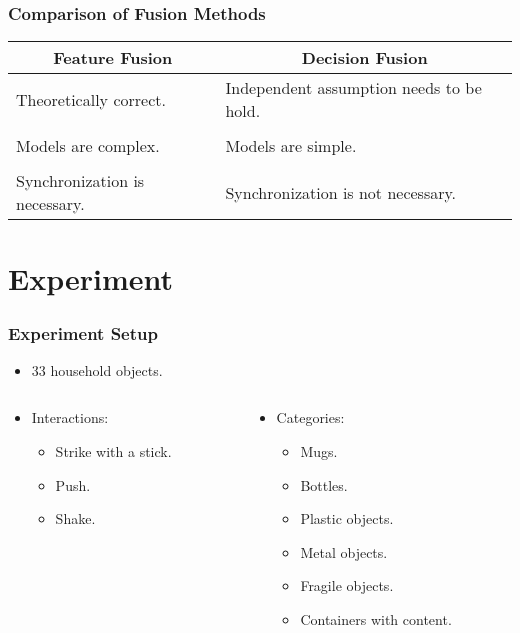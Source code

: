 \documentclass{beamer}
\begin{document}
  \begin{frame}
    \frametitle{Comparison of Fusion Methods}

    \centering
    \begin{tabular}{p{}|p{}}
      \hline
      \multicolumn{1}{c|}{\bfseries Feature Fusion} & \multicolumn{1}{c}{\bfseries Decision Fusion} \\ \hline
      Theoretically correct. & Independent assumption needs to be hold. \\
      \\
      Models are complex. & Models are simple. \\
      \\
      Synchronization is \mbox{necessary}. & Synchronization is not necessary. \\ \hline
    \end{tabular}

  \end{frame}

  \section{Experiment}
  \begin{frame}
    \frametitle{Experiment Setup}

    \begin{itemize}
      \item 33 household objects.
    \end{itemize}

    \begin{columns}
      \begin{column}{.45\textwidth}
        \begin{itemize}
          \item Interactions:
            \begin{itemize}
              \item Strike with a stick.
              \item Push.
              \item Shake.
            \end{itemize}
        \end{itemize}
      \end{column}
      \begin{column}{.45\textwidth}
        \begin{itemize}
          \item Categories:
            \begin{itemize}
              \item Mugs.
              \item Bottles.
              \item Plastic objects.
              \item Metal objects.
              \item Fragile objects.
              \item Containers with content.
            \end{itemize}
        \end{itemize}
      \end{column}
    \end{columns}
  \end{frame}
\end{document}
